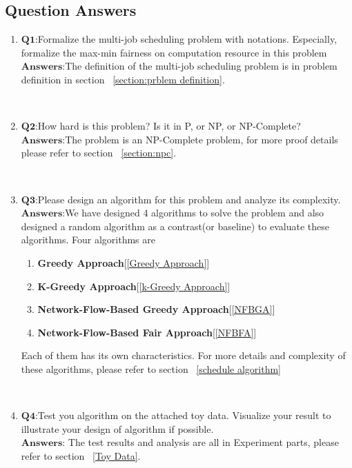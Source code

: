 \subsection{Question Answers}
\begin{enumerate}
    \item $\textbf{Q1:}$Formalize the multi-job scheduling problem with notations. Especially, formalize the max-min fairness on computation resource in this problem\\
    $\textbf{Answers:}$The definition of the multi-job scheduling problem is in problem definition in section ~\ref{section:prblem definition}. ~\par~\par
     \item $\textbf{Q2:}$How hard is this problem? Is it in P, or NP, or NP-Complete?\\
    $\textbf{Answers:}$The problem is an NP-Complete problem, for more proof details please refer to section ~\ref{section:npc}. ~\par~\par
     \item $\textbf{Q3:}$Please design an algorithm for this problem and analyze its complexity.\\
    $\textbf{Answers:}$We have designed 4 algorithms to solve the problem and also designed a random algorithm as a contrast(or baseline) to evaluate these algorithms. Four algorithms are 
    \begin{enumerate}
        \item \textbf{Greedy Approach}[\ref{Greedy Approach}]
        \item \textbf{K-Greedy Approach}[\ref{k-Greedy Approach}]
        \item \textbf{Network-Flow-Based Greedy Approach}[\ref{NFBGA}]
        \item \textbf{Network-Flow-Based Fair Approach}[\ref{NFBFA}]
    \end{enumerate}
    Each of them has its own characteristics. For more details and complexity of these algorithms, please refer to section ~\ref{schedule algorithm}~\par~\par
    \item $\textbf{Q4:}$Test you algorithm on the attached toy data. Visualize your result to illustrate your design of algorithm if possible.\\
    $\textbf{Answers:}$ The test results and analysis are all in Experiment parts, please refer to section ~\ref{Toy Data}.~\par~\par

\end{enumerate}
